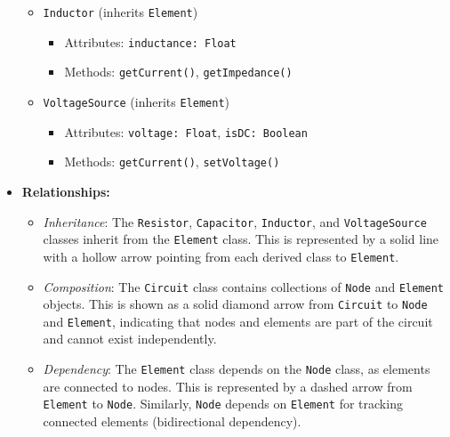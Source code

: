 \documentclass{article}
\begin{document}
\begin{itemize}
\begin{itemize}
        \item \texttt{Inductor} (inherits \texttt{Element})
        \begin{itemize}
            \item Attributes: \texttt{inductance: Float}
            \item Methods: \texttt{getCurrent()}, \texttt{getImpedance()}
        \end{itemize}
        \item \texttt{VoltageSource} (inherits \texttt{Element})
        \begin{itemize}
            \item Attributes: \texttt{voltage: Float}, \texttt{isDC: Boolean}
            \item Methods: \texttt{getCurrent()}, \texttt{setVoltage()}
        \end{itemize}
    \end{itemize}

    \item \textbf{Relationships:}
    \begin{itemize}
        \item \textit{Inheritance}: The \texttt{Resistor}, \texttt{Capacitor}, \texttt{Inductor}, and \texttt{VoltageSource} classes inherit from the \texttt{Element} class. This is represented by a solid line with a hollow arrow pointing from each derived class to \texttt{Element}.
        \item \textit{Composition}: The \texttt{Circuit} class contains collections of \texttt{Node} and \texttt{Element} objects. This is shown as a solid diamond arrow from \texttt{Circuit} to \texttt{Node} and \texttt{Element}, indicating that nodes and elements are part of the circuit and cannot exist independently.
        \item \textit{Dependency}: The \texttt{Element} class depends on the \texttt{Node} class, as elements are connected to nodes. This is represented by a dashed arrow from \texttt{Element} to \texttt{Node}. Similarly, \texttt{Node} depends on \texttt{Element} for tracking connected elements (bidirectional dependency).
    \end{itemize}


\end{itemize}
\end{document}
